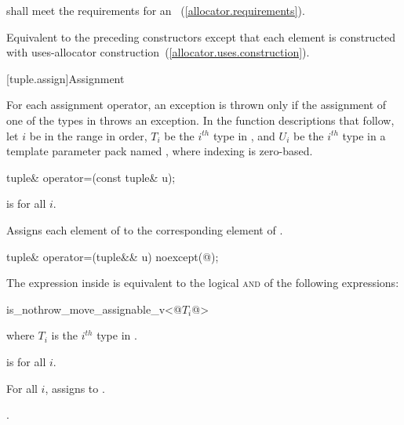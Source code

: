 \begin{itemdescr}
\pnum
\requires {} shall meet the requirements for an
~(\ref{allocator.requirements}).

\pnum
\effects Equivalent to the preceding constructors except that each element is constructed with
uses-allocator construction~(\ref{allocator.uses.construction}).
\end{itemdescr}

[tuple.assign]{Assignment}

\pnum
For each  assignment operator, an exception is thrown only if the
assignment of one of the types in  throws an exception.
In the function descriptions that follow, let $i$ be in the range 
in order, $T_i$ be the $i^{th}$ type in , and $U_i$ be the $i^{th}$ type in a
template parameter pack named , where indexing is zero-based.

%
\begin{itemdecl}
tuple& operator=(const tuple& u);
\end{itemdecl}

\begin{itemdescr}
\pnum
\requires {} is  for all $i$.

\pnum
\effects  Assigns each element of  to the corresponding
element of .

\pnum
\returns  {}
\end{itemdescr}

%
\begin{itemdecl}
tuple& operator=(tuple&& u) noexcept(@\seebelow@);
\end{itemdecl}

\begin{itemdescr}
\pnum
\remark The expression inside  is equivalent to the logical \textsc{and} of the
following expressions:

\begin{codeblock}
is_nothrow_move_assignable_v<@$T_i$@>
\end{codeblock}

where $T_i$ is the $i^{th}$ type in .

\pnum
\requires {} is  for all $i$.

\pnum
\effects For all $i$, assigns  to
.

\pnum
\returns {}.
\end{itemdescr}

